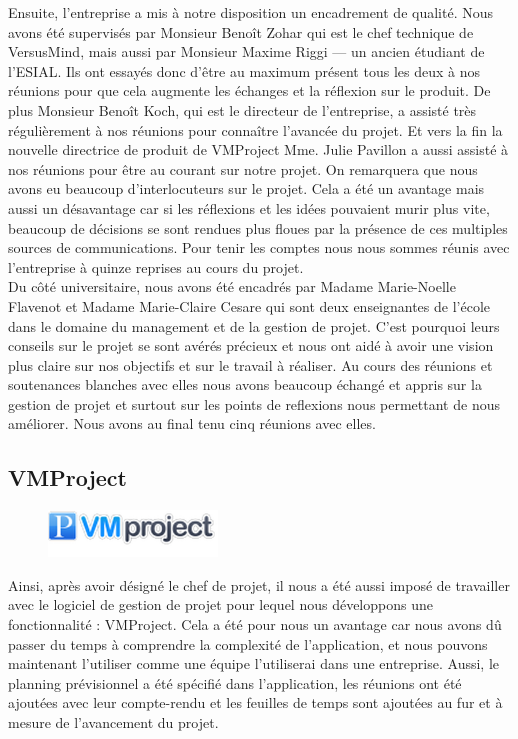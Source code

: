 \documentclass[12pt]{report}
\begin{document}
Ensuite, l’entreprise a mis à notre disposition un encadrement de qualité. Nous avons été supervisés par Monsieur Benoît Zohar qui est le chef technique de VersusMind, mais aussi par Monsieur Maxime Riggi — un ancien étudiant de l’ESIAL. Ils ont essayés donc d’être au maximum présent tous les deux à nos réunions pour que cela augmente les échanges et la réflexion sur le produit. De plus Monsieur Benoît Koch, qui est le directeur de l’entreprise, a assisté très régulièrement à nos réunions pour connaître l’avancée du projet. Et vers la fin la nouvelle directrice de produit de VMProject Mme. Julie Pavillon a aussi assisté à nos réunions pour être au courant sur notre projet. On remarquera que nous avons eu beaucoup d'interlocuteurs sur le projet. Cela a été un avantage mais aussi un désavantage car si les réflexions et les idées pouvaient murir plus vite, beaucoup de décisions se sont rendues plus floues par la présence de ces multiples sources de communications. Pour tenir les comptes nous nous sommes réunis avec l’entreprise à quinze reprises au cours du projet.\\

Du côté universitaire, nous avons été encadrés par Madame Marie-Noelle Flavenot et Madame Marie-Claire Cesare qui sont deux enseignantes de l’école dans le domaine du management et de la gestion de projet. C’est pourquoi leurs conseils sur le projet se sont avérés précieux et nous ont aidé à avoir une vision plus claire sur nos objectifs et sur le travail à réaliser. Au cours des réunions et soutenances blanches avec elles nous avons beaucoup échangé et appris sur la gestion de projet et surtout sur les points de reflexions nous permettant de nous améliorer. Nous avons au final tenu cinq réunions avec elles.\\

		
		\subsection{VMProject}
		
		\begin{figure}[!h]
	\centering
	\includegraphics[width=0.4\textwidth]{pictures/vmplogo.png}
\end{figure}
		
		
Ainsi, après avoir désigné le chef de projet, il nous a été aussi imposé de travailler avec le logiciel de gestion de projet pour lequel nous développons une fonctionnalité : VMProject. Cela a été pour nous un avantage car nous avons dû passer du temps à comprendre la complexité de l’application, et nous pouvons maintenant l’utiliser comme une équipe l’utiliserai dans une entreprise. Aussi, le planning prévisionnel a été spécifié dans l’application, les réunions ont été ajoutées avec leur compte-rendu et les feuilles de temps sont ajoutées au fur et à mesure de l’avancement du projet.\\
\end{document}
